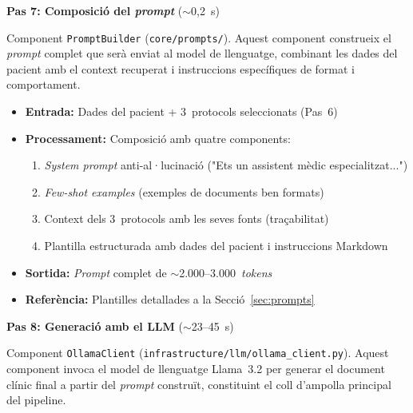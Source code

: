 \documentclass[CAT]{TFUOC}%
\begin{document}
\vspace{0.4em}

\textbf{Pas 7: Composició del \textit{prompt}} ($\sim$0,2~s)

Component \texttt{PromptBuilder} (\texttt{core/prompts/}). Aquest component construeix el \textit{prompt} complet que serà enviat al model de llenguatge, combinant les dades del pacient amb el context recuperat i instruccions específiques de format i comportament.

\begin{itemize}
    \setlength{\itemsep}{0.3em}
    \item \textbf{Entrada:} Dades del pacient + 3~protocols seleccionats (Pas~6)
    \item \textbf{Processament:} Composició amb quatre components:
    \begin{enumerate}
        \item \textit{System prompt} anti-al·lucinació ("Ets un assistent mèdic especialitzat...")
        \item \textit{Few-shot examples} (exemples de documents ben formats)
        \item Context dels 3~protocols amb les seves fonts (traçabilitat)
        \item Plantilla estructurada amb dades del pacient i instruccions Markdown
    \end{enumerate}
    \item \textbf{Sortida:} \textit{Prompt} complet de $\sim$2.000--3.000~\textit{tokens}
    \item \textbf{Referència:} Plantilles detallades a la Secció~\ref{sec:prompts}
\end{itemize}

\vspace{0.4em}

\textbf{Pas 8: Generació amb el LLM} ($\sim$23--45~s)

Component \texttt{OllamaClient} (\texttt{infrastructure/llm/ollama\_client.py}). Aquest component invoca el model de llenguatge Llama~3.2 per generar el document clínic final a partir del \textit{prompt} construït, constituint el coll d'ampolla principal del pipeline.
\end{document}
